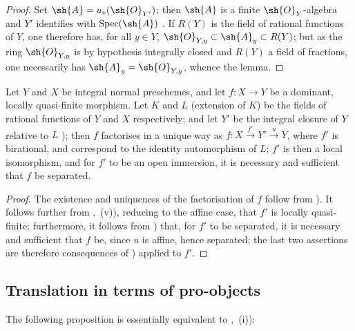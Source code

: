 \begin{proof}
Set $\sh{A}=u_*(\sh{O}_{Y'})$; then $\sh{A}$ is a finite $\sh{O}_Y$-algebra and $Y'$ identifies with $\operatorname{Spec}(\sh{A})$ .
If $R(Y)$ is the field of rational functions of $Y$, one therefore has, for all $y\in Y$, $\sh{O}_{Y,y}\subset\sh{A}_y\subset R(Y)$; but as the ring $\sh{O}_{Y,y}$ is by hypothesis integrally closed and $R(Y)$ a field of fractions, one necessarily has $\sh{A}_y=\sh{O}_{Y,y}$, whence the lemma.
\end{proof}

\begin{corollary}[8.12.11]
\label{IV.8.12.11}
Let $Y$ and $X$ be integral normal preschemes, and let $f:X\to Y$ be a dominant, locally quasi-finite morphism.
Let $K$ and $L$ (extension of $K$) be the fields of rational functions of $Y$ and $X$ respectively; and let $Y'$ be the integral closure of $Y$ relative to $L$ ); then $f$ factorises in a unique way as $f:X\xrightarrow{f'}Y'\xrightarrow{u}Y$, where $f'$ is birational, and correspond to the identity automorphism of $L$; $f'$ is then a local isomorphism, and for $f'$ to be an open immersion, it is necessary and sufficient that $f$ be separated.
\end{corollary}

\begin{proof}
The existence and uniqueness of the factorisation of $f$ follow from ).
It follows further from ,~(v)), reducing to the affine case, that $f'$ is locally quasi-finite; furthermore, it follows from ) that, for $f'$ to be separated, it is necessary and sufficient that $f$ be, since $u$ is affine, hence separated; the last two assertions are therefore consequences of ) applied to $f'$.
\end{proof}

\subsection{Translation in terms of pro-objects}
\label{subsection:IV.8.13}


The following proposition is essentially equivalent to ,~(i)):

